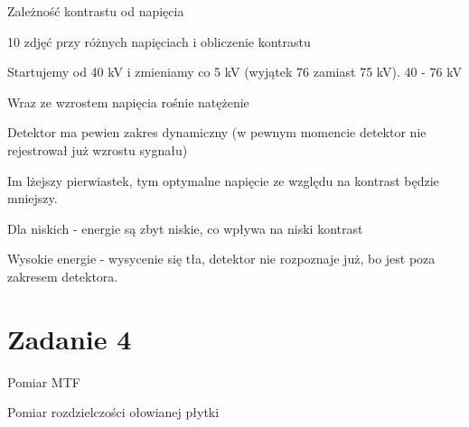 \documentclass{article}
\begin{document}
Zależność kontrastu od napięcia

10 zdjęć przy różnych napięciach i obliczenie kontrastu

Startujemy od 40 kV i zmieniamy co 5 kV (wyjątek 76 zamiast 75 kV). 40 - 76 kV

Wraz ze wzrostem napięcia rośnie natężenie

Detektor ma pewien zakres dynamiczny (w pewnym momencie detektor nie rejestrował już wzrostu sygnału)

Im lżejszy pierwiastek, tym optymalne napięcie ze względu na kontrast będzie mniejszy.

Dla niskich - energie są zbyt niskie, co wpływa na niski kontrast

Wysokie energie - wysycenie się tła, detektor nie rozpoznaje już, bo jest poza zakresem detektora.

\section{Zadanie 4}

Pomiar MTF

Pomiar rozdzielczości ołowianej płytki
\end{document}
